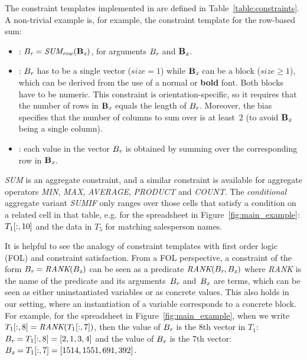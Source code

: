 \begin{example}
The constraint templates implemented in \sname are defined in Table~\ref{table:constraints}.
A non-trivial example is, for example, the constraint template for the row-based sum:

\begin{itemize}
  \item \CName: $B_{\textit{r}} = \textit{SUM\textsubscript{row}}(\mathbf{B_{\textit{x}}})$, for arguments $B_{\textit{r}}$ and $\mathbf{B_{\textit{x}}}$.
  
  \item \CSignature: $B_{\textit{r}}$ has to be a single vector ($\textit{size}=1$) while $\mathbf{B_{\textit{x}}}$ can be a block ($\textit{size} \geq 1$), which can be derived from the use of a normal or \textbf{bold} font.
  Both blocks have to be numeric.
  This constraint is orientation-specific, so it requires that the number of rows in $\mathbf{B_{\textit{x}}}$ equals the length of $B_{\textit{r}}$.
  Moreover, the bias specifies that the number of columns to sum over is at least~$2$ (to avoid $\mathbf{B_{\textit{x}}}$ being a single column).
  
  \item \CFunction: each value in the vector $B_{\textit{r}}$ is obtained by summing over the corresponding row in $\mathbf{B_{\textit{x}}}$.
\end{itemize}
\textit{SUM} is an aggregate constraint, and a similar constraint is available for aggregate operators \textit{MIN}, \textit{MAX}, \textit{AVERAGE}, \textit{PRODUCT} and \textit{COUNT}. The \textit{conditional} aggregate variant \textit{SUMIF} only ranges over those cells that satisfy a condition on a related cell in that table, e.g. for the spreadsheet in Figure~\ref{fig:main_example}: $T_1[:,10]$ and the data in $T_5$ for matching salesperson names.
\end{example}


It is helpful to see the analogy of constraint templates with first order logic (FOL) and constraint satisfaction.
From a FOL perspective, a constraint of the form $B_{\textit{r}} = \textit{RANK}(B_{\textit{x}})$ can be seen as a predicate $\textit{RANK}(B_{\textit{r}}, B_{\textit{x}})$ where \textit{RANK} is the name of the predicate and its arguments~$B_{\textit{r}}$ and~$B_{\textit{x}}$ are terms, which can be seen as either uninstantiated variables or as concrete values.
This also holds in our setting, where an instantiation of a variable corresponds to a concrete block.
For example, for the spreadsheet in Figure~\ref{fig:main_example}, when we write $T_1[:,8] = \textit{RANK}(T_1[:,7])$, then the value of $B_{\textit{r}}$ is the $8$th vector in $T_1$: $B_{\textit{r}} = T_1[:,8] = [2,1,3,4]$ and the value of $B_{\textit{x}}$ is the $7$th vector: $B_{\textit{x}} = T_1[:,7] = [1514, 1551, 691, 392]$.

